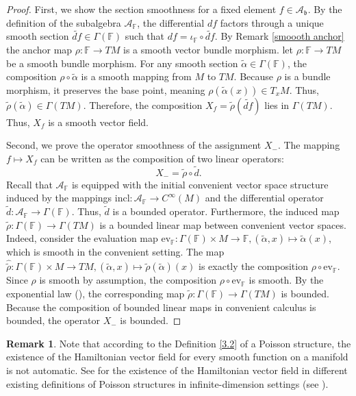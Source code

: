 \documentclass[11pt,reqno]{amsart}
\theoremstyle{definition}
\newtheorem{remark}[theorem]{Remark}
\numberwithin{equation}{section}
\begin{document}
\begin{proof}
First, we show the section smoothness for a fixed element $f \in \mathcal{A}_{\mathfrak{b}}$. By the definition of the subalgebra $\mathcal{A}_{\mathbb{F}}$, the  differential $df$ factors through a unique smooth section $\widetilde{df} \in \Gamma(\mathbb{F})$ such that $df = \iota_{\mathbb{F}} \circ \widetilde{df}$. By Remark \ref{smoooth anchor} the anchor map $\rho: \mathbb{F} \rightarrow TM$ is a smooth vector bundle morphism. let $\rho: \mathbb{F} \rightarrow TM$ be a smooth bundle morphism. For any smooth section $\tilde{\alpha} \in \Gamma(\mathbb{F})$, the composition $\rho \circ \tilde{\alpha}$ is a smooth mapping from $M$ to $TM$. Because $\rho$ is a bundle morphism, it preserves the base point, meaning $\rho(\tilde{\alpha}(x)) \in T_{x}M$. Thus, $\tilde{\rho}(\tilde{\alpha}) \in \Gamma(TM)$.
 Therefore, the composition $X_{f} = \tilde{\rho}(\widetilde{df})$ lies in $\Gamma(TM)$. Thus, $X_{f}$ is a smooth vector field.

Second, we prove the operator smoothness of the assignment $X_{-}$. The mapping $f \mapsto X_{f}$ can be written as the composition of two linear operators:
\[X_{-} = \tilde{\rho} \circ \widetilde{d}.\]
Recall that $\mathcal{A}_{\mathbb F}$ is equipped with the initial convenient vector space structure induced by the mappings $\text{incl}: \mathcal{A}_{\mathbb{F}} \rightarrow C^{\infty}(M)$ and the differential operator $\widetilde{d}: \mathcal{A}_{\mathbb{F}} \rightarrow \Gamma(\mathbb{F})$. Thus, $\widetilde{d}$ is a bounded operator. Furthermore, the induced map $\tilde{\rho}:\Gamma(\mathbb F)\to \Gamma(TM)$ is a bounded linear map between convenient vector spaces. Indeed, consider the evaluation map $\text{ev}_{\mathbb{F}}: \Gamma(\mathbb{F}) \times M \to \mathbb{F}, (\tilde{\alpha}, x) \mapsto \tilde{\alpha}(x)$, which is smooth in the convenient setting. The map $\widehat{\tilde{\rho}}: \Gamma(\mathbb{F}) \times M \to TM, (\tilde \alpha, x)\mapsto \tilde \rho(\tilde\alpha)(x)$ is exactly the composition $\rho \circ \text{ev}_{\mathbb{F}}$. Since $\rho$ is smooth by assumption, the composition $\rho \circ \text{ev}_{\mathbb{F}}$ is smooth. By the exponential law (\cite[Corollary 3.13]{20}), the corresponding map $\tilde{\rho}: \Gamma(\mathbb{F}) \to \Gamma(TM)$ is bounded.  Because the composition of bounded linear maps in convenient calculus is bounded, the operator $X_{-}$ is bounded.
\end{proof}
\begin{remark}
Note that according to the Definition \ref{3.2} of a Poisson structure, the existence of the Hamiltonian vector field for every smooth function on a manifold is not automatic. See \cite[Table 1]{15} for the existence of the Hamiltonian vector field in different existing definitions of Poisson structures in infinite-dimension settings (see \cite[section 4]{15}). 
\end{remark}
\end{document}
